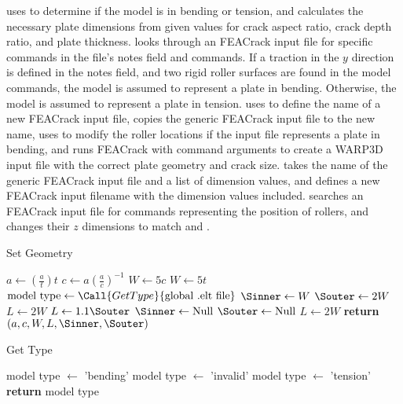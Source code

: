  uses  to determine if the model is in bending or tension, and calculates the necessary plate dimensions from given values for crack aspect ratio, crack depth ratio, and plate thickness.
 looks through an FEACrack input file for specific commands in the file's notes field and commands.
If a traction in the \(y\) direction is defined in the notes field, and two rigid roller surfaces are found in the model commands, the model is assumed to represent a plate in bending.
Otherwise, the model is assumed to represent a plate in tension.
 uses  to define the name of a new FEACrack input file, copies the generic FEACrack input file to the new name, uses  to modify the roller locations if the input file represents a plate in bending, and runs FEACrack with command arguments to create a WARP3D input file with the correct plate geometry and crack size.
 takes the name of the generic FEACrack input file and a list of dimension values, and defines a new FEACrack input filename with the dimension values included.
 searches an FEACrack input file for commands representing the position of rollers, and changes their \(z\) dimensions to match \Sinner and \Souter.
\begin{algorithm}[tbp]
  \caption{Set Geometry}
  \label{alg:set_geometry}
  \begin{algorithmic}
     
    \State $a \gets (\frac{a}{t})t$
    \State $c \gets a (\frac{a}{c})^{-1}$
      \State $W \gets 5c$
    \Else
      \State $W \gets 5t$
    \EndIf
    \State $\text{model type} \gets \Call{Get Type}{\text{global .elt file}}$
      \State $\Sinner \gets W$
      \State $\Souter \gets 2W$
        \State $L \gets 2 W$
      \Else
        \State $L \gets 1.1 \Souter$
      \EndIf
    \Else
      \State $\Sinner \gets \text{Null}$
      \State $\Souter \gets \text{Null}$
      \State $L \gets 2 W$
    \EndIf
    \State \textbf{return} $(a, c, W, L, \Sinner, \Souter)$
    \EndProcedure
  \end{algorithmic}
\end{algorithm}

\begin{algorithm}[tbp]
  \caption{Get Type}
  \label{alg:get_type}
  \begin{algorithmic}
     
            \State model type $\gets$ 'bending'
          \Else
            \State model type $\gets$ 'invalid'
          \EndIf
        \EndIf
      \Else
        \State model type $\gets$ 'tension'
      \EndIf
      \State \textbf{return} model type
    \EndProcedure
  \end{algorithmic}
\end{algorithm}

